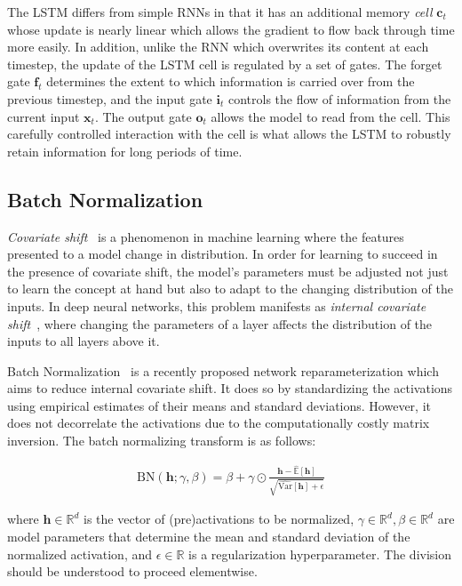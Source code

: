 \documentclass{article} \pdfoutput=1 \usepackage[utf8]{inputenc}
\newcommand{\vect}[1]{\mathbf{#1}}
\newcommand{\ewprod}{\odot}
\newcommand{\reals}{\mathbb{R}}
\begin{document}
The LSTM differs from simple RNNs in that it has an additional memory \emph{cell} 
$\vect{c}_t$ whose update is nearly linear which allows the gradient to flow back 
through time more easily. In addition, unlike the RNN which overwrites its content 
at each timestep, the update of the LSTM cell is regulated by a set of gates.
The forget gate $\vect{f}_t$ determines the extent to which information is carried over from the previous timestep,
and the input gate $\vect{i}_t$ controls the flow of information from the current input $\vect{x}_t$.
The output gate $\vect{o}_t$ allows the model to read from the cell. This carefully 
controlled interaction with the cell is what allows the LSTM to robustly retain 
information for long periods of time.

\subsection{Batch Normalization}

\emph{Covariate shift}~\citep{shimodaira2000improving} is a phenomenon in machine learning where
the features presented to a model change in distribution.
In order for learning to succeed in the presence of covariate shift,
the model's parameters must be adjusted not just to learn the concept at hand
but also to adapt to the changing distribution of the inputs.
In deep neural networks, this problem manifests as \emph{internal covariate shift}~\citep{batchnorm},
where changing the parameters of a layer affects the distribution of the inputs to all layers above it.

Batch Normalization~\citep{batchnorm} is a recently proposed network
reparameterization which aims to reduce internal covariate shift.  It does so by
standardizing the activations using empirical estimates of their means and
standard deviations.  However, it does not decorrelate the activations due to
the computationally costly matrix inversion.  The batch normalizing transform
is as follows:

\begin{align}
\mathrm{BN}(\vect{h}; \gamma, \beta) =
  \beta + \gamma \ewprod
  \frac{\vect{h} -   \widehat{\mathbb{E  }}[\vect{h}]}
       {       \sqrt{\widehat{\mathrm{Var}}[\vect{h}] + \epsilon}}
\end{align}

where $\vect{h} \in \reals^d$ is the vector of (pre)activations to be
normalized, $\gamma \in \reals^d, \beta \in \reals^d$ are model parameters that
determine the mean and standard deviation of the normalized activation, and
$\epsilon \in \reals$ is a regularization hyperparameter. The division should
be understood to proceed elementwise.
\end{document}
